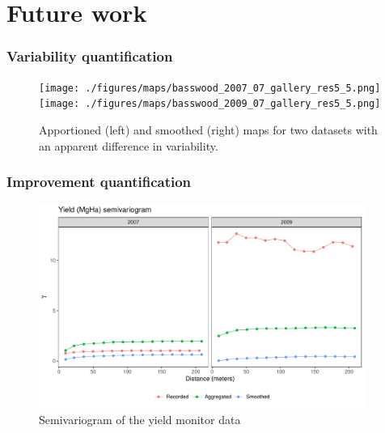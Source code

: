 \documentclass{beamer}
\begin{document}
\section{Future work}

\begin{frame}
  \frametitle{Variability quantification}


  \begin{figure}
    \texttt{[image: ./figures/maps/basswood\_2007\_07\_gallery\_res5\_5.png]}
    \texttt{[image: ./figures/maps/basswood\_2009\_07\_gallery\_res5\_5.png]}

    \caption{Apportioned (left) and smoothed (right) maps for two
      datasets with an apparent difference in variability.}
  \end{figure}
  
\end{frame}

\begin{frame}
  \frametitle{Improvement quantification}

  \begin{figure}
    \includegraphics[width=0.95\textwidth]{./figures/semivariogram.pdf}
    \caption{Semivariogram of the yield monitor data}
  \end{figure}

\end{frame}
\end{document}
